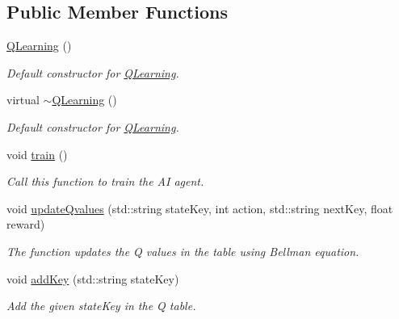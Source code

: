\subsection*{Public Member Functions}
\begin{DoxyCompactItemize}
\item 
\mbox{\label{classQLearning_a4681fb820e19199c9b7032a3e87ed317}} 
\mbox{\hyperlink{classQLearning_a4681fb820e19199c9b7032a3e87ed317}{Q\+Learning}} ()
\begin{DoxyCompactList}\small\item\em Default constructor for \mbox{\hyperlink{classQLearning}{Q\+Learning}}. \end{DoxyCompactList}\item 
\mbox{\label{classQLearning_aa7babdb90c7f697d1e79eb945c2e43b2}} 
virtual \mbox{\hyperlink{classQLearning_aa7babdb90c7f697d1e79eb945c2e43b2}{$\sim$\+Q\+Learning}} ()
\begin{DoxyCompactList}\small\item\em Default constructor for \mbox{\hyperlink{classQLearning}{Q\+Learning}}. \end{DoxyCompactList}\item 
\mbox{\label{classQLearning_ae4e8de3b783a7f9470c4e00f54700276}} 
void \mbox{\hyperlink{classQLearning_ae4e8de3b783a7f9470c4e00f54700276}{train}} ()
\begin{DoxyCompactList}\small\item\em Call this function to train the AI agent. \end{DoxyCompactList}\item 
void \mbox{\hyperlink{classQLearning_a2f0b606448c0645379158cd5d1077a14}{update\+Qvalues}} (std\+::string state\+Key, int action, std\+::string next\+Key, float reward)
\begin{DoxyCompactList}\small\item\em The function updates the Q values in the table using Bellman equation. \end{DoxyCompactList}\item 
void \mbox{\hyperlink{classQLearning_ad87221dd6ac78bca0960e4a367774745}{add\+Key}} (std\+::string state\+Key)
\begin{DoxyCompactList}\small\item\em Add the given state\+Key in the Q table. \end{DoxyCompactList}\item 

\end{DoxyCompactItemize}
